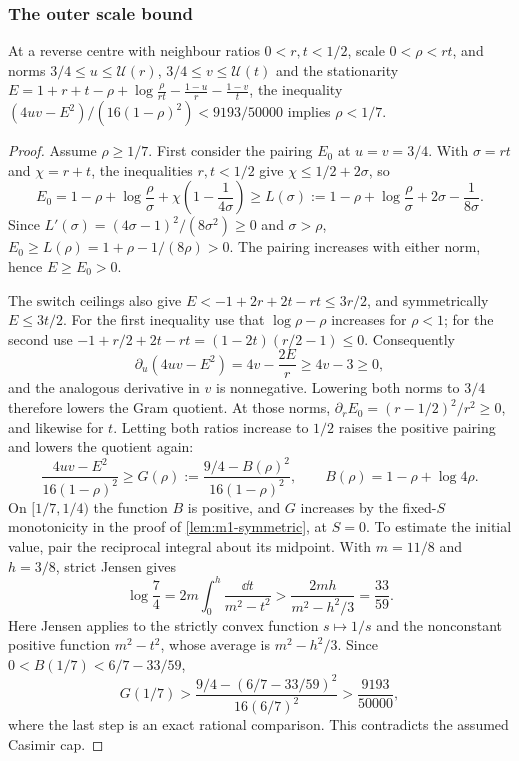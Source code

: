 \subsubsection{The outer scale bound}\label{app:ss-scale}

\begin{lemma}\label{lem:ss-outer-scale}
At a reverse centre with neighbour ratios $0<r,t<1/2$, scale $0<\rho<rt$, and norms
$3/4\le u\le\mathcal U(r)$, $3/4\le v\le\mathcal U(t)$ and the stationarity
$E=1+r+t-\rho+\log\frac{\rho}{rt}-\frac{1-u}{r}-\frac{1-v}{t}$, the inequality
$(4uv-E^2)/(16(1-\rho)^2)<9193/50000$ implies $\rho<1/7$.
\end{lemma}

\begin{proof}
Assume $\rho\ge1/7$. First consider the pairing $E_0$ at $u=v=3/4$.
With $\sigma=rt$ and $\chi=r+t$, the inequalities $r,t<1/2$ give
$\chi\le1/2+2\sigma$, so
\[
 E_0=1-\rho+\log\frac\rho\sigma+\chi\left(1-\frac1{4\sigma}\right)
 \ge L(\sigma):=1-\rho+\log\frac\rho\sigma+2\sigma-\frac1{8\sigma}.
\]
Since $L'(\sigma)=(4\sigma-1)^2/(8\sigma^2)\ge0$ and $\sigma>\rho$,
$E_0\ge L(\rho)=1+\rho-1/(8\rho)>0$. The pairing increases with either norm, hence $E\ge E_0>0$.

The switch ceilings also give $E<-1+2r+2t-rt\le3r/2$, and symmetrically $E\le3t/2$.
For the first inequality use that $\log\rho-\rho$ increases for $\rho<1$; for the second use
$-1+r/2+2t-rt=(1-2t)(r/2-1)\le0$. Consequently
\[
 \partial_u(4uv-E^2)=4v-\frac{2E}{r}\ge4v-3\ge0,
\]
and the analogous derivative in $v$ is nonnegative. Lowering both norms to $3/4$ therefore
lowers the Gram quotient. At those norms,
$\partial_rE_0=(r-1/2)^2/r^2\ge0$, and likewise for $t$.
Letting both ratios increase to $1/2$ raises the positive pairing and lowers the quotient again:
\[
 \frac{4uv-E^2}{16(1-\rho)^2}\ge
 G(\rho):=\frac{9/4-B(\rho)^2}{16(1-\rho)^2},\qquad
 B(\rho)=1-\rho+\log4\rho .
\]
On $[1/7,1/4)$ the function $B$ is positive, and $G$ increases by the fixed-$S$
monotonicity in the proof of \cref{lem:m1-symmetric}, at $S=0$.
To estimate the initial value, pair the reciprocal integral about its midpoint.
With $m=11/8$ and $h=3/8$, strict Jensen gives
\[
 \log\frac74=2m\int_0^h\frac{\dd t}{m^2-t^2}
 >\frac{2mh}{m^2-h^2/3}=\frac{33}{59}.
\]
Here Jensen applies to the strictly convex function $s\mapsto1/s$ and the nonconstant
positive function $m^2-t^2$, whose average is $m^2-h^2/3$.
Since $0<B(1/7)<6/7-33/59$,
\[
 G(1/7)>\frac{9/4-(6/7-33/59)^2}{16(6/7)^2}>\frac{9193}{50000},
\]
where the last step is an exact rational comparison. This contradicts the assumed Casimir cap.
\end{proof}

